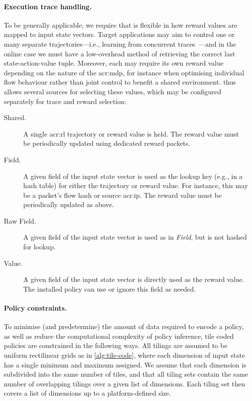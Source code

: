 \paragraph{Execution trace handling.}
To be generally applicable, we require that \approachshort{} is flexible in how reward values are mapped to input state vectors.
Target applications may aim to control one or many separate trajectories---i.e., learning from concurrent traces~\parencite{DBLP:conf/aamas/GroundsK07}---and in the online case we must have a low-overhead method of retrieving the correct last state-action-value tuple.
Moreover, each may require its own reward value depending on the nature of the \gls{acr:mdp}, for instance when optimising individual flow behaviour rather than joint control to benefit a shared environment.
\approachshort{} thus allows several sources for selecting these values, which may be configured separately for trace and reward selection:
\begin{description}
	\item[Shared.] A single \gls{acr:rl} trajectory or reward value is held. The reward value must be periodically updated using dedicated reward packets.
	\item[Field.] A given field of the input state vector is used as the lookup key (e.g., in a hash table) for either the trajectory or reward value. For instance, this may be a packet's flow hash or source \gls{acr:ip}. The reward value must be periodically updated as above.
	\item[Raw Field.] A given field of the input state vector is used as in \emph{Field}, but is not hashed for lookup.
	\item[Value.] A given field of the input state vector is directly used as the reward value. The installed policy can use or ignore this field as needed.
\end{description}

\paragraph{Policy constraints.}
To minimise (and predetermine) the amount of data required to encode a policy, as well as reduce the computational complexity of policy inference, tile coded policies are constrained in the following ways.
All tilings are assumed to be uniform rectilinear grids as in \cref{alg:tile-code}, where each dimension of input state has a single minimum and maximum assigned.
We assume that each dimension is subdivided into the same number of tiles, and that all tiling sets contain the same number of overlapping tilings over a given list of dimensions.
Each tiling set then covers a list of dimensions up to a platform-defined size.

